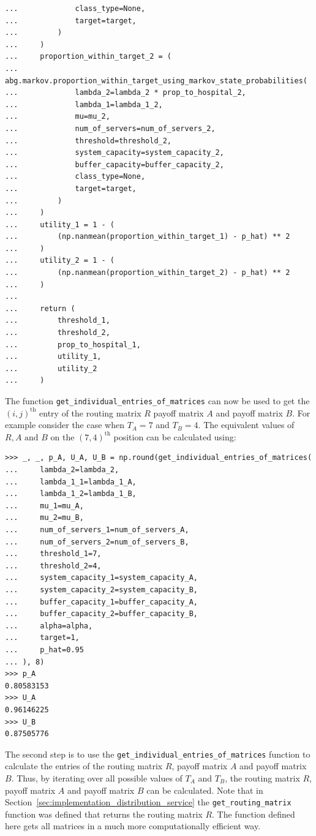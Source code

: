 \begin{lstlisting}[style=pystyle]
...             class_type=None,
...             target=target,
...         )
...     )
...     proportion_within_target_2 = (
...         abg.markov.proportion_within_target_using_markov_state_probabilities(
...             lambda_2=lambda_2 * prop_to_hospital_2,
...             lambda_1=lambda_1_2,
...             mu=mu_2,
...             num_of_servers=num_of_servers_2,
...             threshold=threshold_2,
...             system_capacity=system_capacity_2,
...             buffer_capacity=buffer_capacity_2,
...             class_type=None,
...             target=target,
...         )
...     )
...     utility_1 = 1 - (
...         (np.nanmean(proportion_within_target_1) - p_hat) ** 2
...     )
...     utility_2 = 1 - (
...         (np.nanmean(proportion_within_target_2) - p_hat) ** 2
...     )
... 
...     return (
...         threshold_1,    
...         threshold_2,
...         prop_to_hospital_1,
...         utility_1,
...         utility_2
...     )

\end{lstlisting}

The function \lstinline[style=pystyle]{get_individual_entries_of_matrices} can
now be used to get the \((i,j)^\text{th}\) entry of the routing matrix \(R\)
payoff matrix \(A\) and payoff matrix \(B\).
For example consider the case when \(T_A = 7\) and \(T_B = 4\).
The equivalent values of \(R, A \text{ and } B\) on the \((7, 4)^\text{th}\)
position can be calculated using:

\begin{lstlisting}[style=pystyle]
>>> _, _, p_A, U_A, U_B = np.round(get_individual_entries_of_matrices(
...     lambda_2=lambda_2,
...     lambda_1_1=lambda_1_A,
...     lambda_1_2=lambda_1_B,
...     mu_1=mu_A,
...     mu_2=mu_B,
...     num_of_servers_1=num_of_servers_A,
...     num_of_servers_2=num_of_servers_B,
...     threshold_1=7,
...     threshold_2=4,
...     system_capacity_1=system_capacity_A,
...     system_capacity_2=system_capacity_B,
...     buffer_capacity_1=buffer_capacity_A,
...     buffer_capacity_2=buffer_capacity_B,
...     alpha=alpha,
...     target=1,
...     p_hat=0.95
... ), 8)
>>> p_A
0.80583153
>>> U_A
0.96146225
>>> U_B
0.87505776

\end{lstlisting}

The second step is to use the
\lstinline[style=pystyle]{get_individual_entries_of_matrices} function to
calculate the entries of the routing matrix \(R\), payoff matrix \(A\) and
payoff matrix \(B\).
Thus, by iterating over all possible values of \(T_A\) and \(T_B\), the
routing matrix \(R\), payoff matrix \(A\) and payoff matrix \(B\) can be
calculated.
Note that in Section~\ref{sec:implementation_distribution_service} the
\lstinline[style=pystyle]{get_routing_matrix} function was defined that returns
the routing matrix \(R\).
The function defined here gets all matrices in a much more computationally
efficient way.

